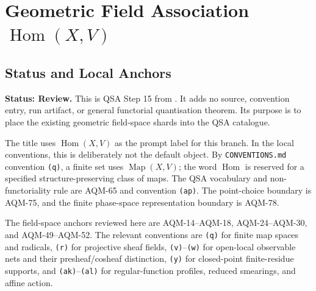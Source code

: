 
\section{Geometric Field Association \texorpdfstring{\(\operatorname{Hom}(X,V)\)}{Hom(X,V)}}
\label{sec:qsa-geometric-field-hom-x-v}

\subsection{Status and Local Anchors}

\textbf{Status: Review.}  This is QSA Step 15 from
.  It adds no source,
convention entry, run artifact, or general functorial quantisation theorem.
Its purpose is to place the existing geometric field-space shards into the
QSA catalogue.

The title uses \(\operatorname{Hom}(X,V)\) as the prompt label for this
branch.  In the local conventions, this is deliberately not the default
object.  By \texttt{CONVENTIONS.md} convention \texttt{(q)}, a finite set
uses \(\operatorname{Map}(X,V)\); the word \(\operatorname{Hom}\) is reserved
for a specified structure-preserving class of maps.  The QSA vocabulary and
non-functoriality rule are AQM-65 and convention \texttt{(ap)}.  The
point-choice boundary is AQM-75, and the finite phase-space representation
boundary is AQM-78.

The field-space anchors reviewed here are AQM-14--AQM-18, AQM-24--AQM-30,
and AQM-49--AQM-52.  The relevant conventions are \texttt{(q)} for finite
map spaces and radicals, \texttt{(r)} for projective sheaf fields,
\texttt{(v)}--\texttt{(w)} for open-local observable nets and their
presheaf/cosheaf distinction, \texttt{(y)} for closed-point finite-residue
supports, and \texttt{(ak)}--\texttt{(al)} for regular-function profiles,
reduced smearings, and affine action.

